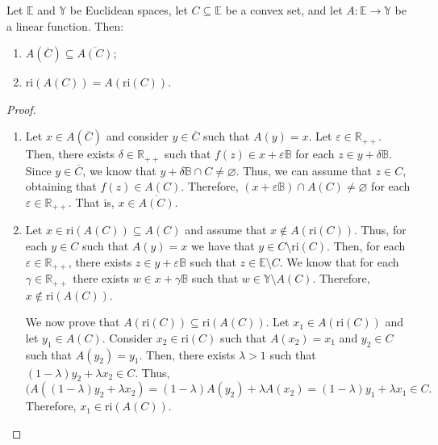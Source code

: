 \documentclass[a4paper]{article}
\begin{document}
\begin{lemma}\label{rilin}
Let \(\mathbb{E}\) and \(\mathbb{Y}\) be Euclidean spaces, let \(C\subseteq\mathbb{E}\) be a convex set, and let \(A\colon\mathbb{E}\to\mathbb{Y}\) be a linear function. Then:
\begin{enumerate}[label=(\roman*)]
\item\(A(\overline{C})\subseteq\overline{A(C)}\);
\item\(\text{ri}(A(C))=A(\text{ri}(C))\).
\end{enumerate}
\end{lemma}
\begin{proof}\hfill
\begin{enumerate}[label=(\roman*)]
\item Let \(x\in A(\overline{C})\) and consider \(y\in\overline{C}\) such that
  \(A(y)=x\). Let \(\varepsilon\in\mathbb{R}_{++}\). Then, there exists \(\delta\in\mathbb{R}_{++}\) such that \(f(z)\in
  x+\varepsilon\mathbb{B}\) for each  \(z\in y+\delta\mathbb{B}\). Since
  \(y\in\overline{C}\), we know that \(y+\delta\mathbb{B}\cap C\not=\varnothing\). Thus, we can assume that \(z\in C\), obtaining that \(f(z)\in A(C)\). Therefore, \((x+\varepsilon\mathbb{B})\cap A(C)\not=\varnothing\) for each \(\varepsilon\in\mathbb{R}_{++}\). That is, \(x\in\overline{A(C)}\).

\item Let \(x\in\text{ri}(A(C))\subseteq A(C)\) and assume that \(x\not\in
  A(\text{ri}(C))\). Thus, for each \(y\in C\) such that \(A(y)=x\) we have that
  \(y\in C\setminus\text{ri}(C)\). Then, for each
  \(\varepsilon\in\mathbb{R}_{++}\), there exists \(z\in
  y+\varepsilon\mathbb{B}\) such that \(z\in\mathbb{E}\setminus C\). We know that for each \(\gamma\in\mathbb{R}_{++}\) there exists \(w\in x+\gamma\mathbb{B}\) such that \(w\in \mathbb{Y}\setminus A(C)\). Therefore, \(x\not\in\text{ri}(A(C))\).

We now prove that \(A(\text{ri}(C))\subseteq\text{ri}(A(C))\). Let \(x_1\in
A(\text{ri}(C))\) and let \(y_1\in A(C)\). Consider \(x_2\in \text{ri}(C)\) such
that \(A(x_2)=x_1\) and \(y_2\in C\) such that \(A(y_2)=y_1\). Then, there exists \(\lambda > 1\) such that \((1-\lambda)y_2+\lambda x_2\in C\). Thus,
\begin{equation*}
(A((1-\lambda)y_2+\lambda x_2)=(1-\lambda)A(y_2)+\lambda A(x_2)= (1-
\lambda)y_1+ \lambda x_1 \in C. 
\end{equation*}
Therefore, \(x_1\in\text{ri}(A(C))\).\qedhere 
\end{enumerate}
\end{proof}
\end{document}
